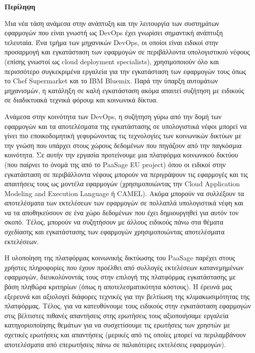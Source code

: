 \thispagestyle{empty}
\begin{titlepage}
\begin{center}
{\bf\Large{Περίληψη}}\\
\end{center}

\indent  

Μια νέα τάση ανάμεσα στην ανάπτυξη και την λειτουργία των συστημάτων εφαρμογών που είναι γνωστή ως  DevOps έχει γνωρίσει σημαντική ανάπτυξη τελευταία. Ένα τμήμα των μηχανικών DevOps, οι οποίοι είναι ειδικοί στην προσαρμογή και εγκατάσταση των εφαρμογών σε περιβάλλοντα υπολογιστικού νέφους (επίσης γνωστοί ως cloud deployment specialists), χρησιμοποιούν όλο και περισσότερο συγκεκριμένα εργαλεία για την εγκατάσταση των εφαρμογών τους όπως το Chef Supermarket και το IBM Bluemix.
Παρά την ύπαρξη αυτομάτων μηχανισμών, η κατάληξη σε καλή εγκατάσταση ακόμα απαιτεί συζήτηση με ειδικούς σε διαδικτυακά τεχνικά φόρουμ και κοινωνικά δίκτυα. 

Ανάμεσα στην κοινότητα των  DevOps, η συζήτηση γύρω από την δομή των εφαρμογών και τα αποτελέσματα της εγκατάστασης σε υπολογιστικά νέφοι μπορεί να γίνει πιο εποικοδομητική γεφυρώνοντας τις τεχνολογίες των κοινωνικών δικτύων με την γνώση που υπάρχει στους χώρους δεδομένων που πηγάζουν από την παγκόσμια κοινότητα. Σε αυτήν την εργασία προτείνουμε μια πλατφόρμα κοινωνικού δικτύου (που παίρνει το όνομά της από το PaaSage EU project) όπου οι ειδικοί στην εγκατάσταση σε περιβάλλοντα νέφους μπορούν να περιγράψουν τις εφαρμογές και τις απαιτήσεις τους ως μοντέλα εφαρμογών (χρησιμοποιώντας την Cloud Application Modeling and Execution Language ή CAMEL). Ακόμα μπορούν να συλλέξουν τα αποτελέσματα των εκτελέσεων των εφαρμογών σε πολλαπλά υπολογιστικά νέφη και να τα αποθηκεύσουν σε ένα χώρο δεδομένων που έχει δημιουργηθεί για αυτόν τον σκοπό. Τέλος, μπορούν να συζητήσουν με άλλους ειδικούς πάνω στα θέματα σχεδίασης και εγκατάστασης των εφαρμογών χρησιμοποιώντας αποτελέσματα εκτελέσεων.

Η υλοποίηση της πλατφόρμας κοινωνικής δικτύωσης του PaaSage παρέχει στους χρήστες πληροφορίες που έχουν προέλθει από συλλογές εκτελέσεων κατανεμημένων εφαρμογών,  διευκολύνοντάς τους στην επιλογή της πλατφόρμας εγκατάστασης με βάση πληθώρα κριτηρίων (όπως η αποτελεσματικότητα κόστους). Η έρευνά μας εξερευνά και αξιολογεί διάφορες τεχνικές για την βελτίωση της κλιμακωσιμότητας της πλατφόρμας. Τέλος, για να κατευθύνουμε τους ειδικούς στην εγκατάσταση εφαρμογών στις βέλτιστες πιθανές απαντήσεις στης ερωτήσεις τους αξιοποιήσαμε εργαλεία κατηγοριοποίησης θεμάτων για να συσχετίσουμε τις ερωτήσεις των χρηστών με σχετικές ερωτήσεις και απαντήσεις (μερικές από τις οποίες μπορεί να περιλαμβάνουν αποτελέσματα από επερωτήσεις πάνω σε παλαιότερες εκτελέσεις εφαρμογών).


\vfill

\end{titlepage}

